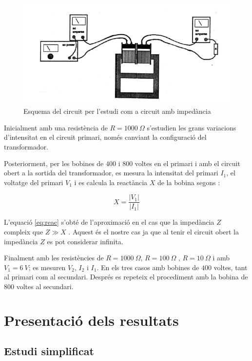 \begin{figure}[htbp!]
    \centering \small \sffamily
    \includegraphics{esqtransf2.png}
    \caption{Esquema del circuit per l'estudi com a circuit amb impedància}
    \label{fig:esq2}
\end{figure}

Inicialment amb una resistència de $R=\SI{1000}{\Omega}$ s'estudien les grans variacions d'intensitat en el circuit primari, només canviant la configuració del transformador. 

Posteriorment, per les bobines de $400$ i $800$ voltes en el primari i amb el circuit obert a la sortida del transformador, es mesura  la intensitat del primari $I_1$, el voltatge del primari $V_1$ i es calcula la reactància $X$ de la bobina segons :

\begin{equation}\label{eq:reac}
    X=\frac{|V_1|}{|I_1|}
\end{equation}

L'equació \cref{eq:reac} s'obté de l'aproximació en el cas que la impedància $Z$ compleix que $Z \gg X$ . Aquest és el nostre cas ja que al tenir el circuit obert la impedància $Z$ es pot considerar infinita. 

Finalment amb les resistències de $R=\SI{1000}{\Omega}$, $R=\SI{100}{\Omega}$ , $R=\SI{10}{\Omega}$ i amb $V_1=\SI{6}{V}$; es mesuren $V_2$, $I_2$ i $I_1$. En els tres casos amb bobines de $400$ voltes, tant al primari com al secundari. Després es repeteix el procediment amb la bobina de $800$ voltes al secundari.


\section{Presentació dels resultats}
\subsection{Estudi simplificat}

